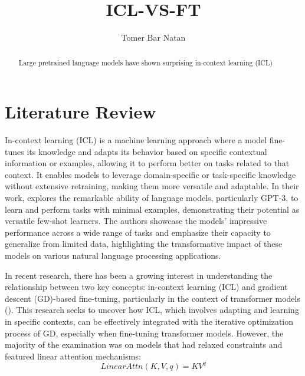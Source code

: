 \documentclass[runningheads]{llncs}
\begin{document}
%
\title{ICL-VS-FT} 

\author{Tomer Bar Natan}


\maketitle      

\begin{abstract}
  Large pretrained language models have shown
  surprising in-context learning (ICL)
\end{abstract}
\section{Literature Review}
In-context learning (ICL) is a machine learning approach where a model fine-tunes its knowledge and adapts its behavior based on specific contextual information or examples, allowing it to perform better on tasks related to that context.
It enables models to leverage domain-specific or task-specific knowledge without extensive retraining, making them more versatile and adaptable.
In their work, \cite{NEURIPS2020_1457c0d6} explores the remarkable ability of language models, particularly GPT-3, to learn and perform tasks with minimal examples, demonstrating their potential as versatile few-shot learners.
The authors showcase the models' impressive performance across a wide range of tasks and emphasize their capacity to generalize from limited data, highlighting the transformative impact of these models on various natural language processing applications.

In recent research, there has been a growing interest in understanding the relationship between two key concepts: in-context learning (ICL) and gradient descent (GD)-based fine-tuning, particularly in the context of transformer models (\cite{pmlr-v202-von-oswald23a,2022arXiv221210559D}).
This research seeks to uncover how ICL, which involves adapting and learning in specific contexts, can be effectively integrated with the iterative optimization process of GD, especially when fine-tuning transformer models.
However, the majority of the examination was on models that had relaxed constraints and featured linear attention mechanisms:
\begin{equation}
  LinearAttn(K,V,q)=KV^q
\end{equation}
\end{document}
